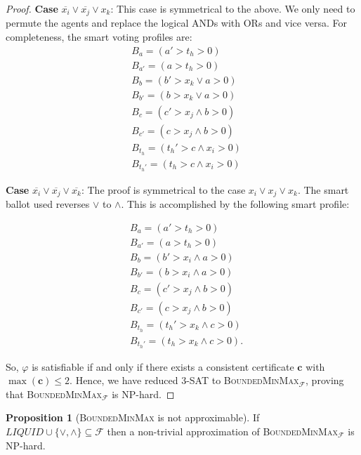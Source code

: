 \documentclass[11pt,a4paper, titlepage]{article}
\theoremstyle{definition}
\newtheorem{proposition}[theorem]{Proposition}
\let\vec\mathbf
\begin{document}
\begin{proof}
    \textbf{Case} $\overline{x_i} \lor \overline{x_j} \lor x_k$: This case is symmetrical to the above. We only need to permute the agents and replace the logical ANDs with ORs and vice versa. For completeness, the smart voting profiles are:     \begin{align*}
        &B_a = (a' > t_h > 0) \\
        &B_{a'} = (a > t_h > 0) \\
        &B_{b} = (b' > x_k \lor a > 0) \\
        &B_{b'} = (b > x_k \lor a > 0) \\
        &B_{c} = (c' > x_j \land b > 0) \\
        &B_{c'} = (c > x_j \land b > 0) \\
        &B_{t_h} = (t_h' > c \land x_i > 0) \\
        &B_{t_h'} = (t_h > c \land x_i > 0)
    \end{align*}

    \textbf{Case} $\overline{x_i} \lor \overline{x_j} \lor \overline{x_k}$: The proof is symmetrical to the case $x_i \lor x_j \lor x_k$. The smart ballot used reverses $\lor$ to $\land$. This is accomplished by the following smart profile:

    \begin{align*}
        &B_a = (a' > t_h > 0) \\
        &B_{a'} = (a > t_h > 0) \\
        &B_{b} = (b' > x_i \land a > 0) \\
        &B_{b'} = (b > x_i \land a > 0) \\
        &B_{c} = (c' > x_j \land b > 0) \\
        &B_{c'} = (c > x_j \land b > 0) \\
        &B_{t_h} = (t_h' > x_k \land c > 0) \\
        &B_{t_h'} = (t_h > x_k \land c > 0).
    \end{align*}

    So, $\varphi$ is satisfiable if and only if there exists a consistent certificate $\vec{c}$ with $\max(\vec{c}) \leq 2$. Hence, we have reduced \textsc{3-SAT} to \textsc{BoundedMinMax}$_\mathcal{F}$, proving that \textsc{BoundedMinMax}$_\mathcal{F}$ is NP-hard.
\end{proof}

\begin{proposition}[\textsc{BoundedMinMax} is not approximable]
    If $\mathit{LIQUID} \cup \{\lor, \land\} \subseteq \mathcal{F}$ then a non-trivial approximation of \textsc{BoundedMinMax}$_\mathcal{F}$ is NP-hard.
\end{proposition}
\end{document}
